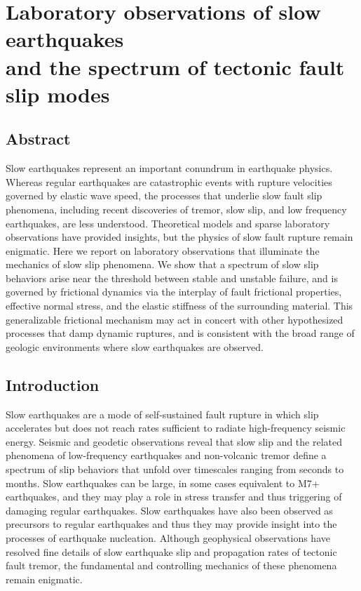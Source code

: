 \chapter{Laboratory observations of slow earthquakes\\ and the spectrum of tectonic fault slip modes}

\section{Abstract}
Slow earthquakes represent an important conundrum in earthquake physics. Whereas regular earthquakes are catastrophic events with rupture velocities governed by elastic wave speed, the processes that underlie slow fault slip phenomena, including recent discoveries of tremor, slow slip, and low frequency earthquakes, are less understood. Theoretical models and sparse laboratory observations have provided insights, but the physics of slow fault rupture remain enigmatic. Here we report on laboratory observations that illuminate the mechanics of slow slip phenomena.  We show that a spectrum of slow slip behaviors arise near the threshold between stable and unstable failure, and is governed by frictional dynamics via the interplay of fault frictional properties, effective normal stress, and the elastic stiffness of the surrounding material. This generalizable frictional mechanism may act in concert with other hypothesized processes that damp dynamic ruptures, and is consistent with the broad range of geologic environments where slow earthquakes are observed.

\section{Introduction}
Slow earthquakes are a mode of self-sustained fault rupture in which slip accelerates but does not reach rates sufficient to radiate high-frequency seismic energy\cite{linde1996san, obara2002nonvolcanic}. Seismic and geodetic observations reveal that slow slip and the related phenomena of low-frequency earthquakes and non-volcanic tremor define a spectrum of slip behaviors that unfold over timescales ranging from seconds to months\cite{obara2002nonvolcanic, rogers2003episodic, ide2007scaling, shelly2007non, peng2010integrated}. Slow earthquakes can be large, in some cases equivalent to M7+ earthquakes, and they may play a role in stress transfer and thus triggering of damaging regular earthquakes\cite{kato2012propagation}.  Slow earthquakes have also been observed as precursors to regular earthquakes and thus they may provide insight into the processes of earthquake nucleation\cite{houston2015low, hawthorne2010tidal}.  Although geophysical observations have resolved fine details of slow earthquake slip and propagation rates of tectonic fault tremor\cite{peng2010integrated,houston2015low,hawthorne2010tidal,shelly2010migrating}, the fundamental and controlling mechanics of these phenomena remain enigmatic. 

